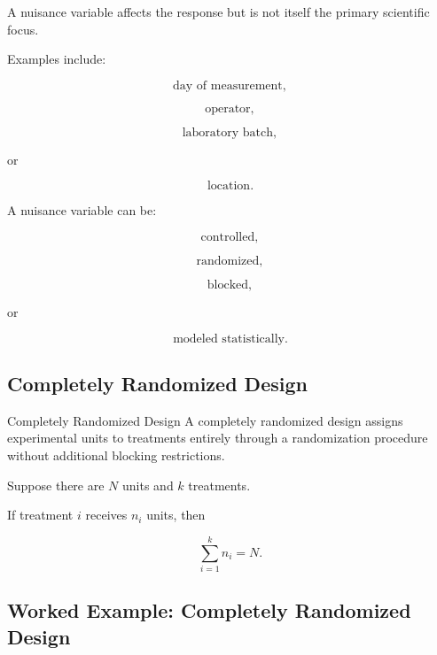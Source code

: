 A nuisance variable affects the response but is not itself the primary
scientific focus.

Examples include:

\[
\boxed{
\text{day of measurement},
}
\]

\[
\boxed{
\text{operator},
}
\]

\[
\boxed{
\text{laboratory batch},
}
\]

or

\[
\boxed{
\text{location}.
}
\]

A nuisance variable can be:

\[
\boxed{
\text{controlled},
}
\]

\[
\boxed{
\text{randomized},
}
\]

\[
\boxed{
\text{blocked},
}
\]

or

\[
\boxed{
\text{modeled statistically}.
}
\]

\subsection{Completely Randomized Design}
\label{subsec:completely-randomized-design}

\begin{definitionbox}{Completely Randomized Design}
A completely randomized design assigns experimental units to treatments
entirely through a randomization procedure without additional blocking
restrictions.
\end{definitionbox}

Suppose there are \(N\) units and \(k\) treatments.

If treatment \(i\) receives \(n_i\) units, then

\[
\boxed{
\sum_{i=1}^{k}
n_i=N.
}
\]

\subsection{Worked Example: Completely Randomized Design}
\label{subsec:worked-completely-randomized-design}


